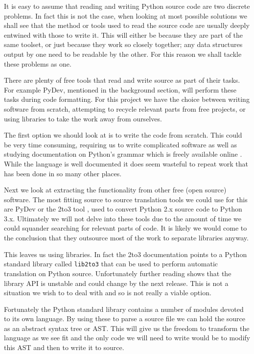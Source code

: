 \documentclass[twoside,a4paper]{report}
\begin{document}
It is easy to assume that reading and writing Python source code are two discrete problems. In fact this is not the case,
when looking at most possible solutions we shall see that the method or tools used to read the source code are usually deeply
entwined with those to write it. This will either be because they are part of the same toolset, or just because they work so closely together;
any data structures output by one need to be readable by the other. For this reason we shall tackle these problems as one.

There are plenty of free tools that read and write source as part of their tasks. For example PyDev, mentioned in the background section, will
perform these tasks during code formatting. For this project we have the choice between writing software from scratch, attempting
to recycle relevant parts from free projects, or using libraries to take the work away from ourselves.

The first option we should look at is to write the code from scratch. This could be very time consuming, requiring
us to write complicated software as well as studying documentation on Python's grammar which is freely available online \cite{pygrammar}.
While the language is well documented it does seem wasteful to repeat work that has been done in so many other places.

Next we look at extracting the functionality from other free (open source) software. The most fitting source to source translation tools
we could use for this are PyDev or the 2to3 tool \cite{2to3}, used to convert Python 2.x source code to Python 3.x. Ultimately we will not
delve into these tools due to the amount of time we could squander searching for relevant parts of code. It is likely we
would come to the conclusion that they outsource most of the work to separate libraries anyway.

This leaves us using libraries. In fact the 2to3 documentation points to a Python standard library called \texttt{lib2to3} that can be used to
perform automatic translation on Python source. Unfortunately further reading shows that the library API is unstable and could change by
the next release. This is not a situation we wish to to deal with and so is not really a viable option.

Fortunately the Python standard library contains a number of modules devoted to its own language. By using these to parse a source file
we can hold the source as an abstract syntax tree or AST. This will give us the freedom to transform the language as we see fit and the only code we
will need to write would be to modify this AST and then to write it to source.
\end{document}
